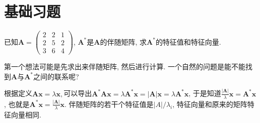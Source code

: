 \section{基础习题}
\begin{problem}
已知$\boldsymbol{A}=\begin{pmatrix}2 & 2 & 1\\
2 & 5 & 2\\
3 & 6 & 4
\end{pmatrix}$, $\boldsymbol{A}^{*}$是$\boldsymbol{A}$的伴随矩阵, 求$\boldsymbol{A}^{*}$的特征值和特征向量. 
\end{problem}
\begin{sol*}
第一个想法可能是先求出来伴随矩阵, 然后进行计算. 一个自然的问题是能不能找到$\boldsymbol{A}$与$\boldsymbol{A}^{*}$之间的联系呢? 

根据定义$\boldsymbol{Ax}=\lambda\boldsymbol{x},$可以导出$\boldsymbol{A^{*}Ax}=\lambda\boldsymbol{A}^{*}\boldsymbol{x}=|\boldsymbol{A}|\boldsymbol{x}=\lambda\boldsymbol{A}^{*}\boldsymbol{x}$,
于是知道$\frac{|\boldsymbol{A}|}{\lambda}\boldsymbol{x}=\boldsymbol{A}^{*}\boldsymbol{x}$,
也就是$\boldsymbol{A}^{*}\boldsymbol{x}=\frac{|\boldsymbol{A}|}{\lambda}\boldsymbol{x}$.
伴随矩阵的若干个特征值是$|A|/\lambda_{i}$, 特征向量和原来的矩阵特征向量相同. 
\end{sol*}

